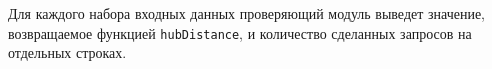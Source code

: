 Для каждого набора входных данных проверяющий модуль выведет значение, возвращаемое
функцией \texttt{hubDistance}, и количество сделанных запросов на отдельных строках.
